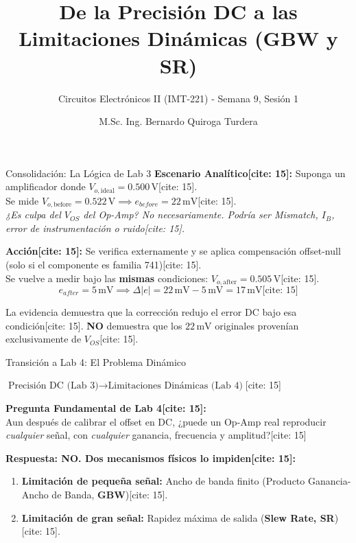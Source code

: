 \documentclass[aspectratio=169]{beamer}
\title[Limitaciones Dinámicas]{De la Precisión DC a las Limitaciones Dinámicas (GBW y SR)}
\subtitle{Circuitos Electrónicos II (IMT-221) - Semana 9, Sesión 1}
\author[B. Quiroga Turdera]{M.Sc. Ing. Bernardo Quiroga Turdera}
\institute[UCB Tarija]{Universidad Católica Boliviana ``San Pablo'' — Sede Tarija}
\date{}
\begin{document}
\begin{frame}
    \titlepage
\end{frame}

\begin{frame}{Consolidación: La Lógica de Lab 3}
    \textbf{Escenario Analítico[cite: 15]:} Suponga un amplificador donde $V_{o,\mathrm{ideal}} = 0.500\,\text{V}$[cite: 15]. \\
    Se mide $V_{o,\mathrm{before}} = 0.522\,\text{V} \implies e_{before} = 22\,\text{mV}$[cite: 15]. \\
    \textit{¿Es culpa del $V_{OS}$ del Op-Amp? No necesariamente. Podría ser Mismatch, $I_B$, error de instrumentación o ruido[cite: 15].}
    
    \vspace{0.2cm}
    \textbf{Acción[cite: 15]:} Se verifica externamente y se aplica compensación offset-null (solo si el componente es familia 741)[cite: 15]. \\
    Se vuelve a medir bajo las \textbf{mismas} condiciones: $V_{o,\mathrm{after}} = 0.505\,\text{V}$[cite: 15].
    \begin{equation*}
        e_{after} = 5\,\text{mV} \implies \Delta|e| = 22\,\text{mV} - 5\,\text{mV} = 17\,\text{mV} \text{[cite: 15]}
    \end{equation*}

    \vspace{0.1cm}
    \begin{tcolorbox}[colback=ucbblue!5, colframe=ucbblue, title=\textbf{Interpretación Físicamente Válida}]
        La evidencia demuestra que la corrección redujo el error DC bajo esa condición[cite: 15]. \textbf{NO} demuestra que los $22\,\text{mV}$ originales provenían exclusivamente de $V_{OS}$[cite: 15].
    \end{tcolorbox}
\end{frame}

\begin{frame}{Transición a Lab 4: El Problema Dinámico}
    \begin{center}
        \Large $\boxed{\text{Precisión DC (Lab 3)} \rightarrow \text{Limitaciones Dinámicas (Lab 4)}}$[cite: 15]
    \end{center}
    
    \vspace{0.4cm}
    \textbf{Pregunta Fundamental de Lab 4[cite: 15]:} \\
    Aun después de calibrar el offset en DC, ¿puede un Op-Amp real reproducir \textit{cualquier} señal, con \textit{cualquier} ganancia, frecuencia y amplitud?[cite: 15]
    
    \vspace{0.3cm}
    \textbf{Respuesta: NO. Dos mecanismos físicos lo impiden[cite: 15]:}
    \begin{enumerate}
        \item \textbf{Limitación de pequeña señal:} Ancho de banda finito (Producto Ganancia-Ancho de Banda, \textbf{GBW})[cite: 15].
        \item \textbf{Limitación de gran señal:} Rapidez máxima de salida (\textbf{Slew Rate, SR})[cite: 15].
    \end{enumerate}
\end{frame}
\end{document}
